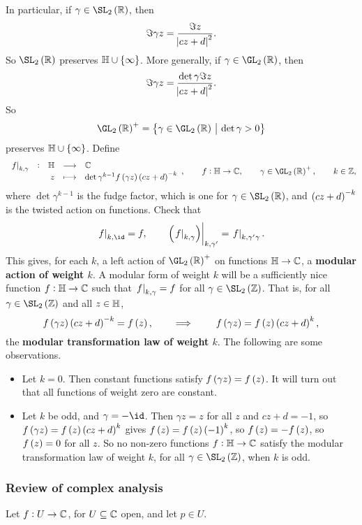 In particular, if $ \gamma \in \SL_2\br{\RR} $, then
$$ \Im \gamma z = \dfrac{\Im z}{\abs{cz + d}^2}. $$
So $ \SL_2\br{\RR} $ preserves $ \HH \cup \cbr{\infty} $. More generally, if $ \gamma \in \GL_2\br{\RR} $, then
$$ \Im \gamma z = \dfrac{\det \gamma\Im z}{\abs{cz + d}^2}. $$
So
$$ \GL_2\br{\RR}^+ = \cbr{\gamma \in \GL_2\br{\RR} \st \det \gamma > 0} $$
preserves $ \HH \cup \cbr{\infty} $. Define
$$ \function[\eval{f}_{k, \gamma}]{\HH}{\CC}{z}{\det \gamma^{k - 1}f\br{\gamma z}\br{cz + d}^{-k}}, \qquad f : \HH \to \CC, \qquad \gamma \in \GL_2\br{\RR}^+, \qquad k \in \ZZ, $$
where $ \det \gamma^{k - 1} $ is the fudge factor, which is one for $ \gamma \in \SL_2\br{\RR} $, and $ \br{cz + d}^{-k} $ is the twisted action on functions. Check that
$$ \eval{f}_{k, \id} = f, \qquad \eval{\br{\eval{f}_{k, \gamma}}}_{k, \gamma'} = \eval{f}_{k, \gamma'\gamma}. $$
This gives, for each $ k $, a left action of $ \GL_2\br{\RR}^+ $ on functions $ \mathbb{H} \to \mathbb{C} $, a \textbf{modular action of weight $ k $}. A modular form of weight $ k $ will be a sufficiently nice function $ f : \mathbb{H} \to \mathbb{C} $ such that $ \left. f \right|_{k, \gamma} = f $ for all $ \gamma \in \SL_2\br{\ZZ} $. That is, for all $ \gamma \in \SL_2\br{\ZZ} $ and all $ z \in \mathbb{H} $,
$$ f\br{\gamma z}\br{cz + d}^{-k} = f\br{z}, \qquad \implies \qquad f\br{\gamma z} = f\br{z}\br{cz + d}^k, $$
the \textbf{modular transformation law of weight $ k $}. The following are some observations.
\begin{itemize}
\item Let $ k = 0 $. Then constant functions satisfy $ f\br{\gamma z} = f\br{z} $. It will turn out that all functions of weight zero are constant.
\item Let $ k $ be odd, and $ \gamma = -\id $. Then $ \gamma z = z $ for all $ z $ and $ cz + d = -1 $, so $ f\br{\gamma z} = f\br{z}\br{cz + d}^k $ gives $ f\br{z} = f\br{z}\br{-1}^k $, so $ f\br{z} = -f\br{z} $, so $ f\br{z} = 0 $ for all $ z $. So no non-zero functions $ f : \mathbb{H} \to \mathbb{C} $ satisfy the modular transformation law of weight $ k $, for all $ \gamma \in \SL_2\br{\ZZ} $, when $ k $ is odd.
\end{itemize}

\pagebreak

\subsubsection{Review of complex analysis}

Let $ f : U \to \mathbb{C} $, for $ U \subseteq \mathbb{C} $ open, and let $ p \in U $.


